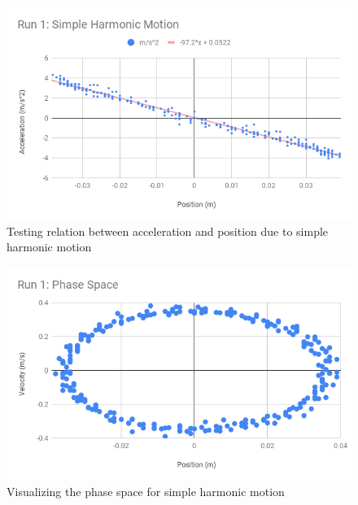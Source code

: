 %
\begin{figure}[ht]
    \centering
    \includegraphics[scale=0.71]{image/11-shm/run-1-shm.png}
    \caption{Testing relation between acceleration and position due to simple harmonic motion}
    \label{figure.11.ax}
\end{figure}
%
\begin{figure}[ht]
    \centering
    \includegraphics[scale=0.71]{image/11-shm/run-1-phase.png}
    \caption{Visualizing the phase space for simple harmonic motion}
    \label{figure.11.phase}
\end{figure}
%
